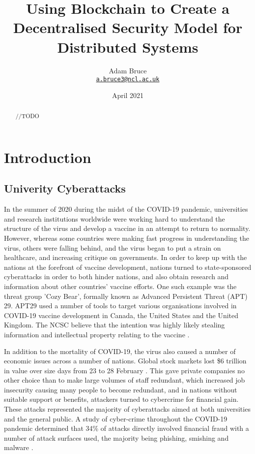 \documentclass[a4paper]{report}
\title{Using Blockchain to Create a Decentralised Security Model for Distributed Systems}
\date{April 2021}
\author{Adam Bruce \\ \texttt{\href{mailto:a.bruce3@ncl.ac.uk}{a.bruce3@ncl.ac.uk}}}
\begin{document}
\maketitle

\begin{abstract}
//TODO
\end{abstract}

\tableofcontents

\newpage

\chapter{Introduction}
\section{Univerity Cyberattacks}
In the summer of 2020 during the midst of the COVID-19 pandemic, universities and research institutions worldwide were working hard to understand the structure of the virus and develop a vaccine in an attempt to return to normality. However, whereas some countries were making fast progress in understanding the virus, others were falling behind, and the virus began to put a strain on healthcare, and increasing critique on governments. In order to keep up with the nations at the forefront of vaccine development, nations turned to state-sponsored cyberattacks in order to both hinder nations, and also obtain research and information about other countries' vaccine efforts. One such example was the threat group 'Cozy Bear', formally known as Advanced Persistent Threat (APT) 29. APT29 used a number of tools to target various organisations involved in COVID-19 vaccine development in Canada, the United States and the United Kingdom. The NCSC believe that the intention was highly likely stealing information and intellectual property relating to the vaccine \cite{APT29}.

In addition to the mortality of COVID-19, the virus also caused a number of economic issues across a number of nations. Global stock markets lost \$6 trillion in value over size days from 23 to 28 February \cite{covspill}. This gave private companies no other choice than to make large volumes of staff redundant, which increased job insecurity causing many people to become redundant, and in nations without suitable support or benefits, attackers turned to cybercrime for financial gain. These attacks represented the majority of cyberattacks aimed at both universities and the general public. A study of cyber-crime throughout the COVID-19 pandemic determined that 34\% of attacks directly involved financial fraud with a number of attack surfaces used, the majority being phishing, smishing and malware \cite{diffattack}.
\end{document}
